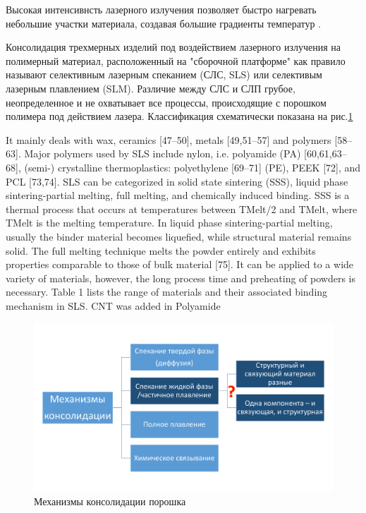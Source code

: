 Высокая интенсивнсть лазерного излучения позволяет быстро нагревать небольшие участки материала, создавая большие градиенты температур \cite{sls-sim2016}.

Консолидация трехмерных изделий под воздействием лазерного излучения на полимерный материал, расположенный на "сборочной платформе" как правило называют селективным лазерным спеканием (СЛС, SLS) или селективым лазерным плавлением (SLM). Различие между СЛС и СЛП грубое, неопределенное и не охватывает все процессы, происходящие с порошком полимера под действием лазера.
Классификация схематически показана на рис.\ref{fig:binding}

It mainly deals with wax, ceramics [47–50], metals
[49,51–57] and polymers [58–63]. Major polymers used by SLS
include nylon, i.e. polyamide (PA) [60,61,63–68], (semi-) crystalline
thermoplastics: polyethylene [69–71] (PE), PEEK [72], and
PCL [73,74]. SLS can be categorized in solid state sintering (SSS),
liquid phase sintering-partial melting, full melting, and chemically
induced binding. SSS is a thermal process that occurs at temperatures
between TMelt/2 and TMelt, where TMelt is the melting temperature.
In liquid phase sintering-partial melting, usually the binder
material becomes liquefied, while structural material remains
solid. The full melting technique melts the powder entirely and
exhibits properties comparable to those of bulk material [75]. It
can be applied to a wide variety of materials, however, the long
process time and preheating of powders is necessary. Table 1 lists
the range of materials and their associated binding mechanism in
SLS.
CNT was added in Polyamide\cite{comp-review}


\begin{figure}[h]
    \centering
    \includegraphics[width = \linewidth]{fig/mecha.pdf}
    \caption{Механизмы консолидации порошка}
    \label{fig:binding}
\end{figure}

